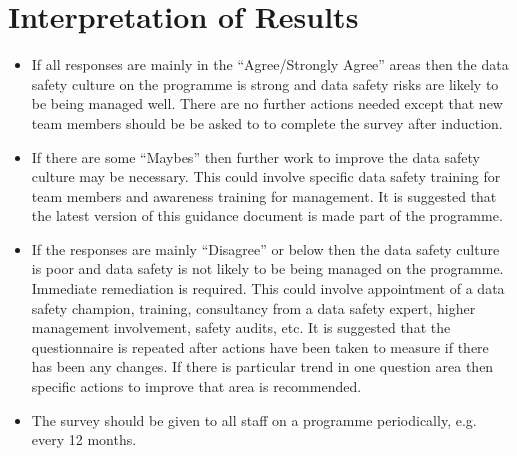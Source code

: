 \section{Interpretation of Results}
\begin{itemize}
\item If all responses are mainly in the ``Agree/Strongly Agree'' areas then the data safety culture on the programme  is strong and data safety risks are likely to be being managed well. There are no further actions needed except that new team members should be be asked to to complete the survey after induction.
\item If there are some ``Maybes'' then further work to improve the data safety culture may be necessary. This could involve specific data safety training for team members and awareness training for management. It is suggested that the latest version of this guidance document is made part of the programme.
\item If the responses are mainly ``Disagree'' or below then the data safety culture is poor and data safety is not likely to be being managed on the programme. Immediate remediation is required. This could involve appointment of a data safety champion, training, consultancy from a data safety expert, higher management involvement, safety audits, etc. It is suggested that the questionnaire is repeated after actions have been taken to measure if there has been any changes. If there is  particular trend in one question area then specific actions to improve that area is recommended.
\item The survey should be given to all staff on a programme periodically, e.g. every 12 months.
\end{itemize}
